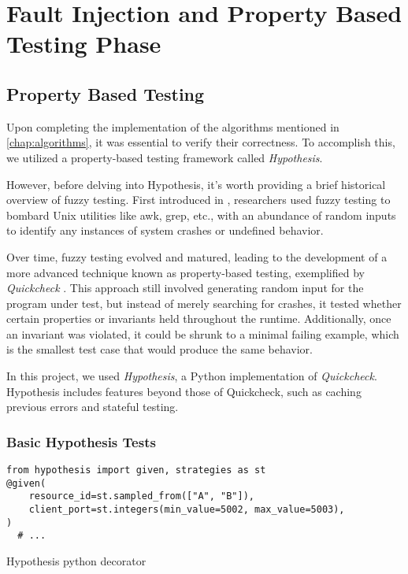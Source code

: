 \section{Fault Injection and Property Based Testing Phase}


\subsection{Property Based Testing}
Upon completing the implementation of the algorithms mentioned in \ref{chap:algorithms}, it was essential to verify their correctness. To accomplish this, we utilized a property-based testing framework called \textit{Hypothesis}.

However, before delving into Hypothesis, it's worth providing a brief historical overview of fuzzy testing. First introduced in \cite{OG_fuzzy_testing}, researchers used fuzzy testing to bombard Unix utilities like awk, grep, etc., with an abundance of random inputs to identify any instances of system crashes or undefined behavior.

Over time, fuzzy testing evolved and matured, leading to the development of a more advanced technique known as property-based testing, exemplified by \textit{Quickcheck} \cite{quickcheck}. This approach still involved generating random input for the program under test, but instead of merely searching for crashes, it tested whether certain properties or invariants held throughout the runtime. Additionally, once an invariant was violated, it could be shrunk to a minimal failing example, which is the smallest test case that would produce the same behavior.

In this project, we used \textit{Hypothesis}, a Python implementation of \textit{Quickcheck}. Hypothesis includes features beyond those of Quickcheck, such as caching previous errors and stateful testing.

\subsubsection{Basic Hypothesis Tests}
\label{subsubsec:basic_hypothesis_tests}


\begin{listing}[!ht]
  \begin{verbatim}
from hypothesis import given, strategies as st
@given(
    resource_id=st.sampled_from(["A", "B"]),
    client_port=st.integers(min_value=5002, max_value=5003),
)
  # ...
  \end{verbatim}
  \caption{Hypothesis python decorator}
  \label{code:hypothesis_decorator}
\end{listing}

